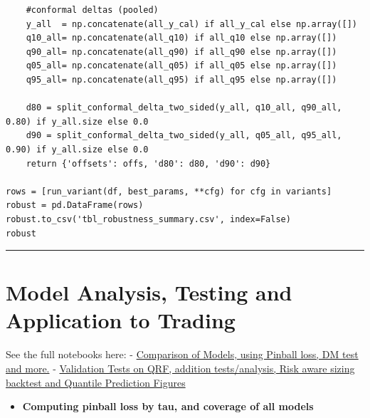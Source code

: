 \documentclass[
  a4paper,
  DIV=11,
  numbers=noendperiod]{scrreprt}
\providecommand{\tightlist}{%
  \setlength{\itemsep}{0pt}\setlength{\parskip}{0pt}}
\begin{document}
\begin{verbatim}
    #conformal deltas (pooled)
    y_all  = np.concatenate(all_y_cal) if all_y_cal else np.array([])
    q10_all= np.concatenate(all_q10) if all_q10 else np.array([])
    q90_all= np.concatenate(all_q90) if all_q90 else np.array([])
    q05_all= np.concatenate(all_q05) if all_q05 else np.array([])
    q95_all= np.concatenate(all_q95) if all_q95 else np.array([])

    d80 = split_conformal_delta_two_sided(y_all, q10_all, q90_all, 0.80) if y_all.size else 0.0
    d90 = split_conformal_delta_two_sided(y_all, q05_all, q95_all, 0.90) if y_all.size else 0.0
    return {'offsets': offs, 'd80': d80, 'd90': d90}

rows = [run_variant(df, best_params, **cfg) for cfg in variants]
robust = pd.DataFrame(rows)
robust.to_csv('tbl_robustness_summary.csv', index=False)
robust
\end{verbatim}

\begin{center}\rule{0.5\linewidth}{0.5pt}\end{center}

\section{Model Analysis, Testing and Application to
Trading}\label{model-analysis-testing-and-application-to-trading}

See the full notebooks here: -
\href{https://github.com/KetchupJL/solana-qrf-interval-forecasting/blob/main/notebooks/Model\%20Building/03_QRF_v3_analysis.ipynb}{Comparison
of Models, using Pinball loss, DM test and more.} -
\href{https://github.com/KetchupJL/solana-qrf-interval-forecasting/blob/main/notebooks/Model\%20Building/03_QRF_v4_dev.ipynb}{Validation
Tests on QRF, addition tests/analysis, Risk aware sizing backtest and
Quantile Prediction Figures}

\begin{itemize}
\tightlist
\item
  \textbf{Computing pinball loss by tau, and coverage of all models}
\end{itemize}
\end{document}
